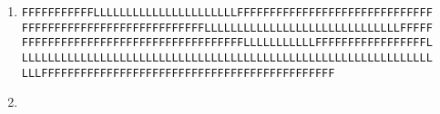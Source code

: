 \documentclass{homework}
\begin{document}
\begin{enumerate}
\begin{enumerate}
\item \begin{verbatim}
FFFFFFFFFFFLLLLLLLLLLLLLLLLLLLLLLFFFFFFFFFFFFFFFFFFFFFFFFFFFFFF
FFFFFFFFFFFFFFFFFFFFFFFFFFFFLLLLLLLLLLLLLLLLLLLLLLLLLLLLLLFFFFF
FFFFFFFFFFFFFFFFFFFFFFFFFFFFFFFFFFLLLLLLLLLLLFFFFFFFFFFFFFFFFFL
LLLLLLLLLLLLLLLLLLLLLLLLLLLLLLLLLLLLLLLLLLLLLLLLLLLLLLLLLLLLLLL
LLLFFFFFFFFFFFFFFFFFFFFFFFFFFFFFFFFFFFFFFFFFFFFF
\end{verbatim}

\item \begin{verbatim}
\end{verbatim}

\end{enumerate}

\end{enumerate}
\end{document}
